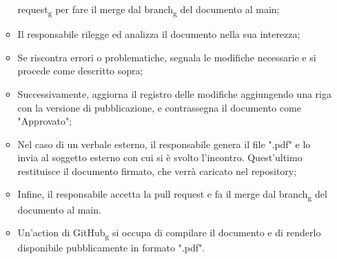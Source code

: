 \begin{itemize}
\begin{itemize}
                        request\textsubscript{g} per fare il merge dal branch\textsubscript{g} del
                        documento al main;
                  \item Il responsabile rilegge ed analizza il documento nella sua interezza;
                  \item Se riscontra errori o problematiche, segnala le modifiche necessarie e si
                        procede come descritto sopra;
                  \item Successivamente, aggiorna il registro delle modifiche aggiungendo una riga con
                        la versione di pubblicazione, e contrassegna il documento come "Approvato";
                  \item Nel caso di un verbale esterno, il responsabile genera il file ".pdf" e lo
                        invia al soggetto esterno con cui si è svolto l'incontro. Quest'ultimo
                        restituisce il documento firmato, che verrà caricato nel repository;
                  \item Infine, il responsabile accetta la pull request e fa il merge dal
                        branch\textsubscript{g} del documento al main.
                  \item Un'action di GitHub\textsubscript{g} si occupa di compilare il documento e di
                        renderlo disponibile pubblicamente in formato ".pdf".
            \end{itemize}
\end{itemize}

\newpage
